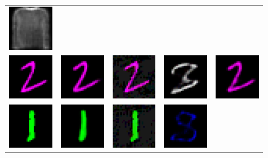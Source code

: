 \begin{figure}
\begin{tabular}{ccccc}
        \includegraphics[width=0.1\linewidth]{pics/3_adv_att/fashion_mnist_adv_rec_hmc_14.pdf}\\
        \includegraphics[width=0.1\linewidth]{pics/3_adv_att/color_mnist_ref_4.pdf} & \includegraphics[width=0.1\linewidth]{pics/3_adv_att/color_mnist_ref_rec_4.pdf} &
        \includegraphics[width=0.1\linewidth]{pics/3_adv_att/color_mnist_adv_4.pdf} & \includegraphics[width=0.1\linewidth]{pics/3_adv_att/color_mnist_adv_rec_4.pdf} & 
        \includegraphics[width=0.1\linewidth]{pics/3_adv_att/color_mnist_adv_rec_hmc_4.pdf}\\
        \includegraphics[width=0.1\linewidth]{pics/3_adv_att/color_mnist_ref_9.pdf} & \includegraphics[width=0.1\linewidth]{pics/3_adv_att/color_mnist_ref_rec_9.pdf} &
        \includegraphics[width=0.1\linewidth]{pics/3_adv_att/color_mnist_adv_9.pdf} & \includegraphics[width=0.1\linewidth]{pics/3_adv_att/color_mnist_adv_rec_9.pdf} & 

\end{tabular}
\end{figure}
